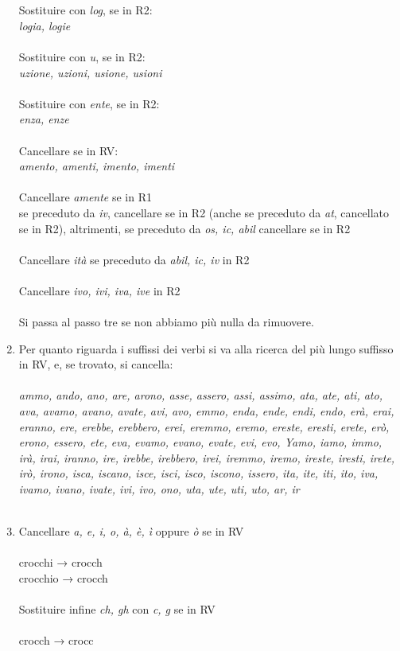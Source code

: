 \documentclass{article}
\theoremstyle{plain}
\theoremstyle{definition}
\begin{document}
\begin{enumerate}
\\
\\
Sostituire con \textit{log}, se in R2:
\\ 
\textit{logia, logie}
\\
\\
Sostituire con \textit{u}, se in R2:
\\
\textit{uzione, uzioni, usione, usioni} 
\\
\\
Sostituire con \textit{ente}, se in R2:
\\
\textit{enza, enze}  
\\
\\
Cancellare se in RV:
\\
\textit{amento, amenti, imento, imenti}
\\
\\
Cancellare \textit{amente} se in R1
\\
se preceduto da \textit{iv}, cancellare se in R2 (anche se preceduto da \textit{at}, cancellato se in R2), altrimenti, se preceduto da \textit{os, ic, abil} cancellare se in R2 
\\
\\
Cancellare \textit{ità} se preceduto da \textit{abil, ic, iv} in R2
\\
\\
Cancellare \textit{ivo, ivi, iva, ive} in R2 
\\
\\
Si passa al passo tre se non abbiamo più nulla da rimuovere.

\item Per quanto riguarda i suffissi dei verbi si va alla ricerca del più lungo suffisso in RV, e, se trovato, si cancella:
\\
\\
\textit{ammo, ando, ano, are, arono, asse, assero, assi, assimo, ata, ate, ati, ato, ava, avamo, avano, avate, avi, avo, emmo, enda, ende, endi, endo, erà, erai, eranno, ere, erebbe, erebbero, erei, eremmo, eremo, ereste, eresti, erete, erò, erono, essero, ete, eva, evamo, evano, evate, evi, evo, Yamo, iamo, immo, irà, irai, iranno, ire, irebbe, irebbero, irei, iremmo, iremo, ireste, iresti, irete, irò, irono, isca, iscano, isce, isci, isco, iscono, issero, ita, ite, iti, ito, iva, ivamo, ivano, ivate, ivi, ivo, ono, uta, ute, uti, uto, ar, ir}
\\
\\
\item Cancellare \textit{a, e, i, o, à, è, ì} oppure \textit{ò} se in RV
\\
\\
crocchi → crocch
\\
crocchio → crocch 
\\
\\
Sostituire infine \textit{ch, gh} con \textit{c, g} se in RV 
\\
\\
crocch → crocc 
\end{enumerate}
\end{document}
